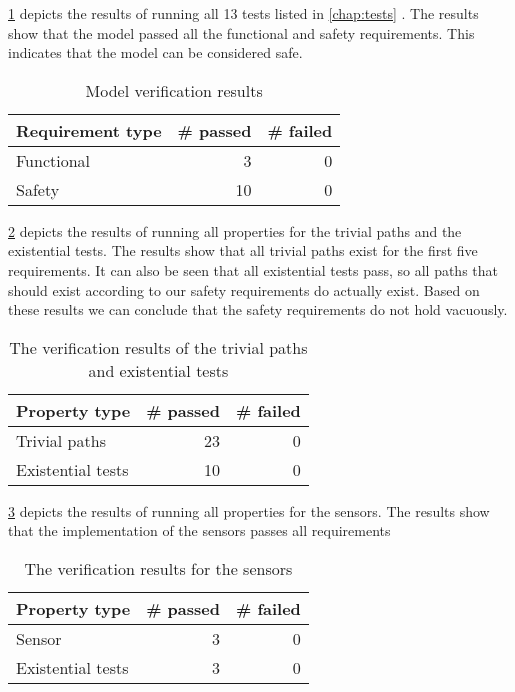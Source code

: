 	\cref{tbl:verificationResults} depicts the results of running all 13
	tests listed in \cref{chap:tests} .
	The results show that the model passed all the functional and safety requirements.
	This indicates that the model can be considered safe.
		
	\begin{table}[!htbp]
		\begin{center}
		\begin{tabular}{l | r r}
			Requirement type & \# passed & \# failed \\ \hline
			Functional & 3 & 0 \\
			Safety & 10 & 0	\\
		\end{tabular}
		\caption{Model verification results}
		\label{tbl:verificationResults}
		\end{center}
	\end{table}

	
	\cref{tbl:trivialResults} depicts the results of running all properties for the trivial paths and the existential tests. 
	The results show that all trivial paths exist for the first five requirements.
	It can also be seen that all existential tests pass, so all paths that should exist according to our safety requirements do actually exist.
	Based on these results we can conclude that the safety requirements do not hold vacuously.
		
	\begin{table}[!htbp]
		\begin{center}
		\begin{tabular}{l | r r}
			Property type & \# passed & \# failed \\ \hline
			Trivial paths & 23 & 0	\\
			Existential tests	&	10	&	0	\\
		\end{tabular}
		\caption{The verification results of the trivial paths and existential tests}
		\label{tbl:trivialResults}
		\end{center}
	\end{table}
	
	\cref{tbl:sensorResults} depicts the results of running all properties for the sensors.
	The results show that the implementation of the sensors passes all requirements
	
	\begin{table}[!htbp]
		\begin{center}
		\begin{tabular}{l | r r}
		Property type	& \# passed & \# failed \\	\hline
		Sensor			& 3	& 0 \\
		Existential tests & 3 & 0 \\
		\end{tabular}
		\caption{The verification results for the sensors}
		\label{tbl:sensorResults}
		\end{center}
	\end{table}
	   
   
